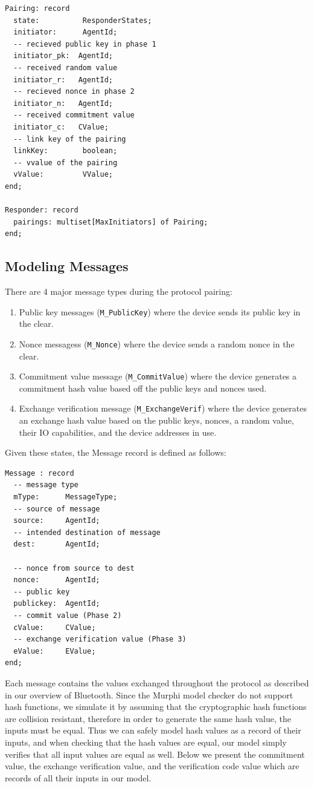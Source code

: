 \documentclass{acm_proc_article-sp}
\begin{document}
\begin{verbatim}
Pairing: record
  state:          ResponderStates;
  initiator:      AgentId;
  -- recieved public key in phase 1
  initiator_pk:  AgentId;
  -- received random value
  initiator_r:   AgentId;
  -- recieved nonce in phase 2
  initiator_n:   AgentId;
  -- received commitment value
  initiator_c:   CValue;
  -- link key of the pairing
  linkKey:        boolean;
  -- vvalue of the pairing
  vValue:         VValue;
end;
  
Responder: record
  pairings: multiset[MaxInitiators] of Pairing;
end;
\end{verbatim}

\subsection{Modeling Messages}
There are 4 major message types during the protocol pairing: 

\begin{enumerate}[1.]
    \item Public key messages (\texttt{M\_PublicKey}) where the device sends its public key in the clear.
    \item Nonce messagess (\texttt{M\_Nonce}) where the device sends a random nonce in the clear.
    \item Commitment value message (\texttt{M\_CommitValue}) where the device generates a commitment hash value based off the public keys and nonces used.
    \item Exchange verification message (\texttt{M\_ExchangeVerif}) where the device generates an exchange hash value based on the public keys, nonces, a random value, their IO capabilities, and the device addresses in use.
\end{enumerate}

Given these states, the Message record is defined as follows:

\begin{verbatim}
Message : record
  -- message type
  mType:      MessageType;
  -- source of message
  source:     AgentId;
  -- intended destination of message
  dest:       AgentId;
  
  -- nonce from source to dest
  nonce:      AgentId;
  -- public key
  publickey:  AgentId;
  -- commit value (Phase 2)
  cValue:     CValue;
  -- exchange verification value (Phase 3)
  eValue:     EValue;
end;
\end{verbatim}

Each message contains the values exchanged throughout the protocol as described in our overview of Bluetooth. Since the Murphi model checker do not support hash functions, we simulate it by assuming that the cryptographic hash functions are collision resistant, therefore in order to generate the same hash value, the inputs must be equal. Thus we can safely model hash values as a record of their inputs, and when checking that the hash values are equal, our model simply verifies that all input values are equal as well. Below we present the commitment value, the exchange verification value, and the verification code value which are records of all their inputs in our model.
\end{document}

